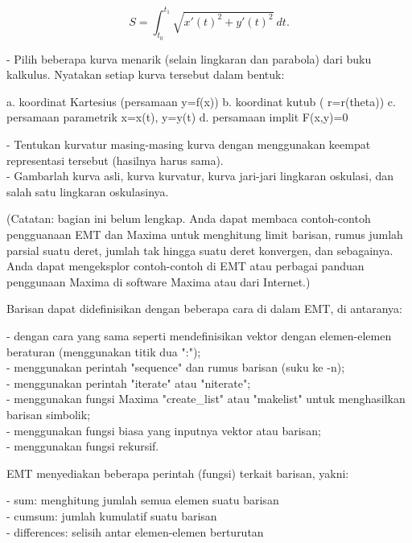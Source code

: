 \documentclass[a4paper,10pt]{article}
\begin{document}
\begin{eulernotebook}
\begin{eulercomment}
\begin{eulercomment}
\begin{eulercomment}
\begin{eulercomment}
\begin{eulercomment}
\end{eulercomment}
\begin{eulerformula}
\[
S=\int_{t_0}^{t_1} \sqrt{x'(t)^2+y'(t)^2}\ dt.
\]
\end{eulerformula}
\begin{eulercomment}
- Pilih beberapa kurva menarik (selain lingkaran dan parabola) dari buku  kalkulus. Nyatakan setiap kurva tersebut dalam bentuk:\\
\end{eulercomment}
\begin{eulerttcomment}
  a. koordinat Kartesius (persamaan y=f(x))
  b. koordinat kutub ( r=r(theta))
  c. persamaan parametrik x=x(t), y=y(t)
  d. persamaan implit F(x,y)=0
\end{eulerttcomment}
\begin{eulercomment}
- Tentukan kurvatur masing-masing kurva dengan menggunakan keempat representasi tersebut (hasilnya harus sama).\\
- Gambarlah kurva asli, kurva kurvatur, kurva jari-jari lingkaran oskulasi, dan salah satu lingkaran oskulasinya.
\end{eulercomment}
\begin{eulercomment}
(Catatan: bagian ini belum lengkap. Anda dapat membaca contoh-contoh pengguanaan EMT dan
Maxima untuk menghitung limit barisan, rumus jumlah parsial suatu deret, jumlah tak hingga
suatu deret konvergen, dan sebagainya. Anda dapat mengeksplor contoh-contoh di EMT atau
perbagai panduan penggunaan Maxima di software Maxima atau dari Internet.)

Barisan dapat didefinisikan dengan beberapa cara di dalam EMT, di antaranya:

- dengan cara yang sama seperti mendefinisikan vektor dengan elemen-elemen beraturan
(menggunakan titik dua ":");\\
- menggunakan perintah "sequence" dan rumus barisan (suku ke -n);\\
- menggunakan perintah "iterate" atau "niterate";\\
- menggunakan fungsi Maxima "create\_list" atau "makelist" untuk menghasilkan barisan
simbolik;\\
- menggunakan fungsi biasa yang inputnya vektor atau barisan;\\
- menggunakan fungsi rekursif.

EMT menyediakan beberapa perintah (fungsi) terkait barisan, yakni:

- sum: menghitung jumlah semua elemen suatu barisan\\
- cumsum: jumlah kumulatif suatu barisan\\
- differences: selisih antar elemen-elemen berturutan


\end{eulercomment}
\end{eulercomment}
\end{eulercomment}
\end{eulercomment}
\end{eulercomment}
\end{eulernotebook}
\end{document}
